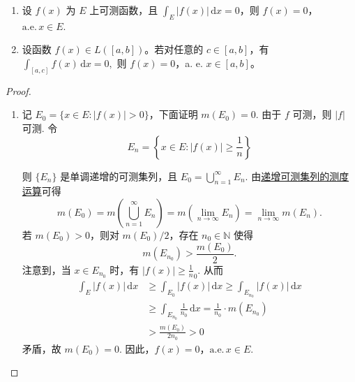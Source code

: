 \documentclass[../../main.tex]{subfiles}%
\begin{document}
\begin{theorem}[可积函数几乎处处为零的判别法]\label{theorem:可积函数几乎处处为零的一种判别法}
\begin{enumerate}[(1)]
\item 设 \( f(x) \) 为 \( E \) 上可测函数，且 \( \int_E |f(x)|\,\mathrm{d}x = 0 \)，则 \( f(x) = 0 \)，\(\text{a.e.}\, x \in E \).

\item 设函数 $f(x) \in L([a,b])$。若对任意的 $c \in [a,b]$，有$\int_{[a,c]} f(x) \, \mathrm{d}x = 0,$
则 $f(x) = 0$，a. e. $x \in [a,b]$。
\end{enumerate}
\end{theorem}
\begin{proof}
\begin{enumerate}[(1)]
\item 记 \( E_0 = \{ x \in E : |f(x)| > 0 \} \)，下面证明 \( m(E_0) = 0 \). 由于 \( f \) 可测，则 \( |f| \) 可测. 令
\[
E_n = \left\{ x \in E : |f(x)| \geqslant \frac{1}{n} \right\}
\]

则 \( \{ E_n \} \) 是单调递增的可测集列，且 \( E_0 = \bigcup_{n = 1}^{\infty} E_n \). 由\hyperref[theorem:递增可测集列的测度运算]{递增可测集列的测度运算}可得
\[
m(E_0) = m\left( \bigcup_{n = 1}^{\infty} E_n \right) = m\left( \lim_{n \to \infty} E_n \right) = \lim_{n \to \infty} m(E_n).
\]
若 \( m(E_0) > 0 \)，则对 \( m(E_0)/2 \)，存在 \( n_0 \in \mathbb{N} \) 使得
\[
m(E_{n_0}) > \frac{m(E_0)}{2}.
\]
注意到，当 \( x \in E_{n_0} \) 时，有 \( |f(x)| \geqslant \frac{1}{n}_0 \). 从而
\begin{align*}
\int_E |f(x)|\,\mathrm{d}x &\geqslant \int_{E_0} |f(x)|\,\mathrm{d}x \geqslant \int_{E_{n_0}} |f(x)|\,\mathrm{d}x \\
&\geqslant \int_{E_{n_0}} \frac{1}{n_0}\,\mathrm{d}x = \frac{1}{n_0} \cdot m(E_{n_0}) \\
&> \frac{m(E_0)}{2n_0} > 0
\end{align*}
矛盾，故 \( m(E_0) = 0 \). 因此，\( f(x) = 0 \)，\(\text{a.e.}\, x \in E \).


\end{enumerate}
\end{proof}
\end{document}
